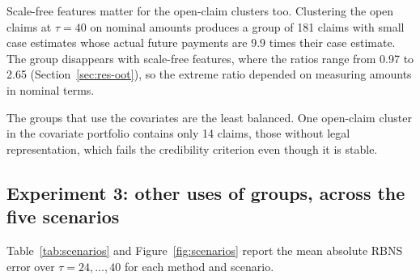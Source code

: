 Scale-free features matter for the open-claim clusters too. Clustering the open claims at $\tau=40$ on nominal amounts produces a group of 181 claims with small case estimates whose actual future payments are 9.9 times their case estimate. The group disappears with scale-free features, where the ratios range from 0.97 to 2.65 (Section~\ref{sec:res-oot}), so the extreme ratio depended on measuring amounts in nominal terms.

The groups that use the covariates are the least balanced. One open-claim cluster in the covariate portfolio contains only 14 claims, those without legal representation, which fails the credibility criterion even though it is stable.

\subsection{Experiment 3: other uses of groups, across the five scenarios}
\label{sec:res-uses}

Table~\ref{tab:scenarios} and Figure~\ref{fig:scenarios} report the mean absolute RBNS error over $\tau = 24,\dots,40$ for each method and scenario.

